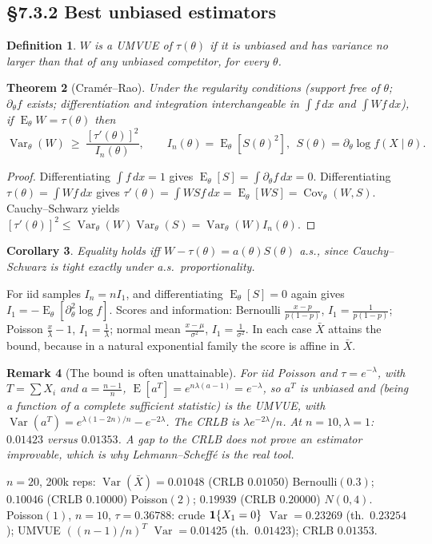\documentclass[11pt]{article}
\newtheorem{theorem}{Theorem}[section]
\newtheorem{definition}[theorem]{Definition}
\newtheorem{remark}[theorem]{Remark}
\newtheorem{corollary}[theorem]{Corollary}
\DeclareMathOperator{\Var}{Var}\DeclareMathOperator{\Cov}{Cov}\DeclareMathOperator{\E}{E}
\begin{document}
\subsection{\S7.3.2 Best unbiased estimators}
\begin{definition}
$W$ is a UMVUE of $\tau(\theta)$ if it is unbiased and has variance no larger than that of any unbiased competitor, for every $\theta$.
\end{definition}
\begin{theorem}[Cram\'er--Rao]
Under the regularity conditions (support free of $\theta$; $\partial_\theta f$ exists; differentiation and integration interchangeable in $\int f\,dx$ and $\int Wf\,dx$), if $\E_\theta W=\tau(\theta)$ then
\[\Var_\theta(W)\ \ge\ \frac{[\tau'(\theta)]^2}{I_n(\theta)},\qquad I_n(\theta)=\E_\theta[S(\theta)^2],\ \ S(\theta)=\partial_\theta\log f(X\mid\theta).\]
\end{theorem}
\begin{proof}
Differentiating $\int f\,dx=1$ gives $\E_\theta[S]=\int\partial_\theta f\,dx=0$. Differentiating $\tau(\theta)=\int Wf\,dx$ gives $\tau'(\theta)=\int WSf\,dx=\E_\theta[WS]=\Cov_\theta(W,S)$. Cauchy--Schwarz yields $[\tau'(\theta)]^2\le\Var_\theta(W)\Var_\theta(S)=\Var_\theta(W)I_n(\theta)$.
\end{proof}
\begin{corollary}
Equality holds iff $W-\tau(\theta)=a(\theta)S(\theta)$ a.s., since Cauchy--Schwarz is tight exactly under a.s.\ proportionality.
\end{corollary}
For iid samples $I_n=nI_1$, and differentiating $\E_\theta[S]=0$ again gives $I_1=-\E_\theta[\partial^2_\theta\log f]$. Scores and information: Bernoulli $\frac{x-p}{p(1-p)}$, $I_1=\frac1{p(1-p)}$; Poisson $\frac x\lambda-1$, $I_1=\frac1\lambda$; normal mean $\frac{x-\mu}{\sigma^2}$, $I_1=\frac1{\sigma^2}$. In each case $\bar X$ attains the bound, because in a natural exponential family the score is affine in $\bar X$.
\begin{remark}[The bound is often unattainable]
For iid Poisson and $\tau=e^{-\lambda}$, with $T=\sum X_i$ and $a=\frac{n-1}n$, $\E[a^T]=e^{n\lambda(a-1)}=e^{-\lambda}$, so $a^T$ is unbiased and (being a function of a complete sufficient statistic) is the UMVUE, with $\Var(a^T)=e^{\lambda(1-2n)/n}-e^{-2\lambda}$. The CRLB is $\lambda e^{-2\lambda}/n$. At $n=10,\lambda=1$: $0.01423$ versus $0.01353$. A gap to the CRLB does not prove an estimator improvable, which is why Lehmann--Scheff\'e is the real tool.
\end{remark}
\begin{simbox}
$n=20$, 200k reps: $\Var(\bar X)=0.01048$ (CRLB $0.01050$) Bernoulli$(0.3)$; $0.10046$ (CRLB $0.10000$) Poisson$(2)$; $0.19939$ (CRLB $0.20000$) $N(0,4)$.\\
Poisson$(1)$, $n=10$, $\tau=0.36788$: crude $\mathbf 1\{X_1=0\}$ $\Var=0.23269$ (th.\ $0.23254$); UMVUE $((n-1)/n)^T$ $\Var=0.01425$ (th.\ $0.01423$); CRLB $0.01353$.
\end{simbox}
\end{document}
